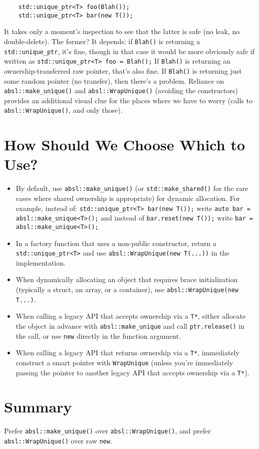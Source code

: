 \begin{itemize}
    \begin{verbatim}
    std::unique_ptr<T> foo(Blah());
    std::unique_ptr<T> bar(new T());
    \end{verbatim}
    It takes only a moment’s inspection to see that the latter is safe (no leak, no double-delete). The former? It depends: if \texttt{Blah()} is returning a \texttt{std::unique_ptr}, it’s fine, though in that case it would be more obviously safe if written as
    \texttt{std::unique_ptr<T> foo = Blah();}
    If \texttt{Blah()} is returning an ownership-transferred raw pointer, that’s also fine. If \texttt{Blah()} is returning just some random pointer (no transfer), then there’s a problem. Reliance on \texttt{absl::make_unique()} and \texttt{absl::WrapUnique()} (avoiding the constructors) provides an additional visual clue for the places where we have to worry (calls to \texttt{absl::WrapUnique()}, and only those).
\end{itemize}

\section{How Should We Choose Which to Use?}
\begin{itemize}
    \item By default, use \texttt{absl::make_unique()} (or \texttt{std::make_shared()} for the rare cases where shared ownership is appropriate) for dynamic allocation. For example, instead of: \texttt{std::unique_ptr<T> bar(new T());} write \texttt{auto bar = absl::make_unique<T>();} and instead of \texttt{bar.reset(new T());} write \texttt{bar = absl::make_unique<T>();}
    \item In a factory function that uses a non-public constructor, return a \texttt{std::unique_ptr<T>} and use \texttt{absl::WrapUnique(new T(...))} in the implementation.
    \item When dynamically allocating an object that requires brace initialization (typically a struct, an array, or a container), use \texttt{absl::WrapUnique(new T{...})}.
    \item When calling a legacy API that accepts ownership via a \texttt{T*}, either allocate the object in advance with \texttt{absl::make_unique} and call \texttt{ptr.release()} in the call, or use \texttt{new} directly in the function argument.
    \item When calling a legacy API that returns ownership via a \texttt{T*}, immediately construct a smart pointer with \texttt{WrapUnique} (unless you’re immediately passing the pointer to another legacy API that accepts ownership via a \texttt{T*}).
\end{itemize}

\section{Summary}
Prefer \texttt{absl::make_unique()} over \texttt{absl::WrapUnique()}, and prefer \texttt{absl::WrapUnique()} over raw \texttt{new}.
